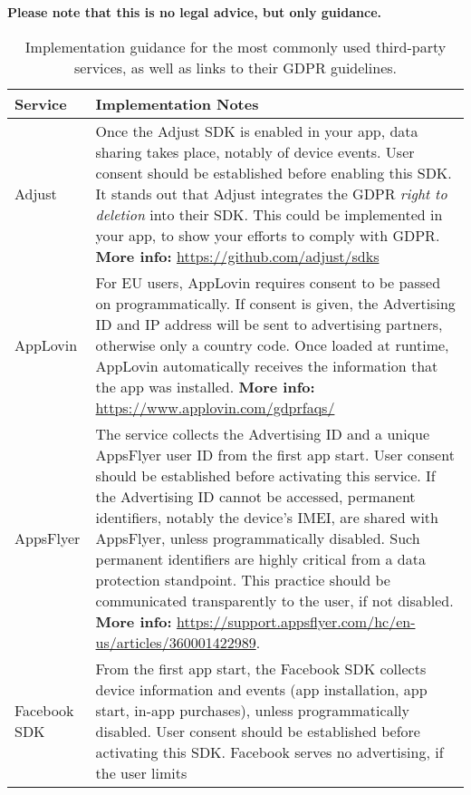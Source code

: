 \documentclass[
	12pt,
	a4paper,
	]{scrartcl}
\begin{document}
	\textbf{Please note that this is no legal advice, but only guidance.}
	\begin{footnotesize}
		\begin{longtable}{lp{}}
			\caption{Implementation guidance for the most commonly used 
			third-party services, as well as links to their GDPR 
			guidelines.}\label{tab:implementation_guidance_trackers} \\
			\toprule
			Service & Implementation Notes \\ 
			\midrule 
			Adjust & Once the Adjust SDK is enabled in your app, data 
			sharing 
			takes place, notably of device events.
			User consent should be established before enabling this SDK.
			It stands out that Adjust integrates the GDPR \textit{right to 
			deletion} into their SDK. This could be implemented in your 
			app, 
			to show your efforts to comply with GDPR. \newline 
			\textbf{More 
			info:} \url{https://github.com/adjust/sdks} \\
			\midrule 
			AppLovin & For EU users, AppLovin requires consent to be 
			passed on 
			programmatically.
			If consent is given, the Advertising ID and IP address will be 
			sent to advertising partners, otherwise only a country code.
			Once loaded at runtime,
			AppLovin automatically receives the information that the app 
			was 
			installed. \newline \textbf{More info:} 
			\url{https://www.applovin.com/gdprfaqs/} \\
			\midrule 
			AppsFlyer & The service collects the Advertising ID and a 
			unique 
			AppsFlyer user ID from the first app start.
			User consent should be established before activating this 
			service.
			If the Advertising ID cannot be accessed, permanent 
			identifiers, 
			notably the device's IMEI, are shared with AppsFlyer, unless 
			programmatically disabled. Such permanent identifiers are 
			highly 
			critical from a data protection standpoint.
			This practice should be communicated transparently to the 
			user, if 
			not disabled. \newline
			\textbf{More info:} 
			\url{https://support.appsflyer.com/hc/en-us/articles/360001422989}.
			 \\
			\midrule 
			Facebook SDK & From the first app start, the Facebook SDK 
			collects 
			device information and events (app installation, app start, 
			in-app 
			purchases), unless programmatically disabled.
			User consent should be established before activating this SDK.
			Facebook serves no advertising, if the user limits 

\end{longtable}
\end{footnotesize}
\end{document}

